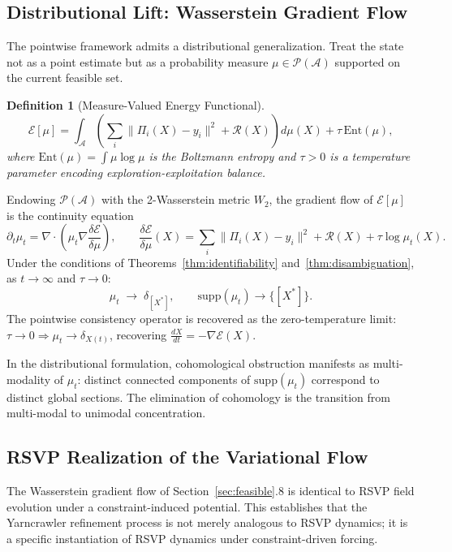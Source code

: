 \documentclass[11pt, oneside]{article}
\newtheorem{definition}[theorem]{Definition}
\begin{document}
\subsection{Distributional Lift: Wasserstein Gradient Flow}

The pointwise framework admits a distributional generalization. Treat the state not as a
point estimate but as a probability measure $\mu \in \mathcal{P}(\mathcal{A})$ supported
on the current feasible set.

\begin{definition}[Measure-Valued Energy Functional]
\[
\mathcal{E}[\mu] = \int_{\mathcal{A}} \left(
\sum_i \|\Pi_i(X) - y_i\|^2 + \mathcal{R}(X)
\right) d\mu(X) + \tau\, \mathrm{Ent}(\mu),
\]
where $\mathrm{Ent}(\mu) = \int \mu \log \mu$ is the Boltzmann entropy and $\tau > 0$
is a temperature parameter encoding exploration-exploitation balance.
\end{definition}

Endowing $\mathcal{P}(\mathcal{A})$ with the 2-Wasserstein metric $W_2$, the gradient
flow of $\mathcal{E}[\mu]$ is the continuity equation
\[
\partial_t \mu_t = \nabla \cdot \left(
\mu_t \nabla \frac{\delta \mathcal{E}}{\delta \mu}
\right),
\qquad
\frac{\delta \mathcal{E}}{\delta \mu}(X) =
\sum_i \|\Pi_i(X) - y_i\|^2 + \mathcal{R}(X) + \tau \log \mu_t(X).
\]
Under the conditions of Theorems~\ref{thm:identifiability} and~\ref{thm:disambiguation},
as $t \to \infty$ and $\tau \to 0$:
\[
\mu_t \;\longrightarrow\; \delta_{[X^*]}, \qquad \mathrm{supp}(\mu_t) \to \{[X^*]\}.
\]
The pointwise consistency operator is recovered as the zero-temperature limit:
$\tau \to 0 \Rightarrow \mu_t \to \delta_{X(t)}$, recovering
$\frac{dX}{dt} = -\nabla\mathcal{E}(X)$.

In the distributional formulation, cohomological obstruction manifests as multi-modality
of $\mu_t$: distinct connected components of $\mathrm{supp}(\mu_t)$ correspond to
distinct global sections. The elimination of cohomology is the transition from
multi-modal to unimodal concentration.

\subsection{RSVP Realization of the Variational Flow}

The Wasserstein gradient flow of Section~\ref{sec:feasible}.8 is identical to RSVP
field evolution under a constraint-induced potential. This establishes that the Yarncrawler
refinement process is not merely analogous to RSVP dynamics; it is a specific
instantiation of RSVP dynamics under constraint-driven forcing.
\end{document}
